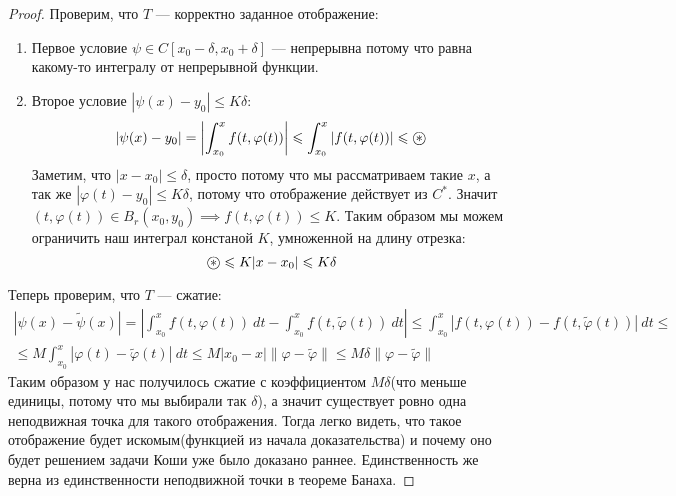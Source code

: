\begin{proof}
Проверим, что $T$ --- корректно заданное отображение:
\begin{enumerate}
    \item Первое условие $\psi \in C[x_0 - \delta, x_0 + \delta]$ --- непрерывна потому что равна какому-то интегралу от непрерывной функции.
    \item Второе условие $|\psi(x) - y_0| \leqslant K \delta$:
    \begin{equation*}
    |\psi(x) - y_0| = 
    \left | \int_{x_0}^{x} f(t, \varphi(t)) \right | \leqslant
    \int_{x_0}^{x} | f(t, \varphi(t)) | \leqslant \oast
    \end{equation*}
    Заметим, что $|x - x_0| \leqslant \delta$, просто потому что мы рассматриваем такие $x$, а так же $| \varphi(t) - y_0 | \leqslant K \delta$, потому что отображение действует из $C^{*}$. Значит $(t, \varphi(t)) \in B_r(x_0, y_0) \implies f(t, \varphi(t)) \leqslant K$. Таким образом мы можем ограничить наш интеграл констаной $K$, умноженной на длину отрезка:
    \begin{equation*}
    \oast \leqslant
    K |x - x_0|
    \leqslant K \delta
    \end{equation*}
\end{enumerate}
Теперь проверим, что $T$ --- сжатие:
\begin{equation*}
    \begin{gathered}
    |\psi(x) - \widetilde{\psi}(x)| =
    \left | \int_{x_0}^{x} f(t, \varphi(t)) \: dt - \int_{x_0}^{x} f(t, \widetilde{\varphi}(t)) \: dt \right | \leqslant
    \int_{x_0}^{x} | f(t, \varphi(t)) - f(t, \widetilde{\varphi}(t)) | \: dt 
    \leqslant \\ \leqslant
    M \int_{x_0}^{x} | \varphi(t) - \widetilde{\varphi}(t)| \: dt \leqslant
    M |x_0 - x| \| \varphi - \widetilde{\varphi} \| \leqslant
    M \delta \| \varphi - \widetilde{\varphi} \|
    \end{gathered}
\end{equation*}
Таким образом у нас получилось сжатие с коэффициентом $M\delta$(что меньше единицы, потому что мы выбирали так $\delta$), а значит существует ровно одна неподвижная точка для такого отображения. Тогда легко видеть, что такое отображение будет искомым(функцией из начала доказательства) и почему оно будет решением задачи Коши уже было доказано раннее. Единственность же верна из единственности неподвижной точки в теореме Банаха.
\end{proof}
